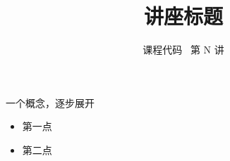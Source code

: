 \documentclass[aspectratio=169,11pt]{beamer}
\title{讲座标题}
\subtitle{课程代码 \textperiodcentered\ 第 N 讲}
\author{}\institute{}\date{}
\begin{document}
\begin{frame}[plain]
\titlepage
\end{frame}

\begin{frame}{一个概念，逐步展开}
\begin{itemize}
\item<1-> 第一点
\item<2-> 第二点
\end{itemize}
\end{frame}

\end{document}
